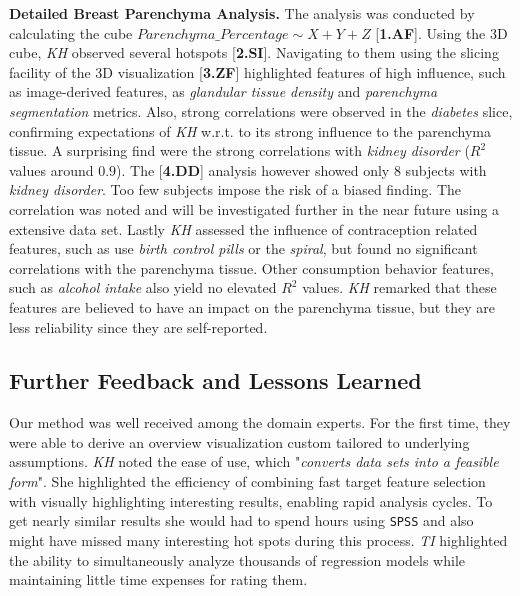\documentclass[journal]{style/vgtc} 			          %
\begin{document}
\textbf{Detailed Breast Parenchyma Analysis.}
The analysis was conducted by calculating the cube $Parenchyma\_Percentage \sim X + Y + Z$ [\textbf{1.AF}].
Using the 3D cube, \emph{KH} observed several hotspots [\textbf{2.SI}].
Navigating to them using the slicing facility of the 3D visualization [\textbf{3.ZF}] highlighted features of high influence, such as image-derived features, as \emph{glandular tissue density} and \emph{parenchyma segmentation} metrics.
Also, strong correlations were observed in the \emph{diabetes} slice, confirming expectations of \emph{KH} w.r.t. to its strong influence to the parenchyma tissue.
A surprising find were the strong correlations with \emph{kidney disorder} ($R^2$ values around $0.9$).
The [\textbf{4.DD}] analysis however showed only 8 subjects with \emph{kidney disorder}.
Too few subjects impose the risk of a biased finding.
The correlation was noted and will be investigated further in the near future using a extensive data set.
Lastly \emph{KH} assessed the influence of contraception related features, such as use \emph{birth control pills} or the \emph{spiral}, but found no significant correlations with the parenchyma tissue.
Other consumption behavior features, such as \emph{alcohol intake} also yield no elevated $R^2$ values.
\emph{KH} remarked that these features are believed to have an impact on the parenchyma tissue, but they are less reliability since they are self-reported.
\subsection{Further Feedback and Lessons Learned} \label{Lessons Learned}
Our method was well received among the domain experts.
For the first time, they were able to derive an overview visualization custom tailored to underlying assumptions.
\emph{KH} noted the ease of use, which "\emph{converts data sets into a feasible form}".
She highlighted the efficiency of combining fast target feature selection with visually highlighting interesting results, enabling rapid analysis cycles.
To get nearly similar results she would had to spend hours using \texttt{SPSS} and also might have missed many interesting hot spots during this process.
\emph{TI} highlighted the ability to simultaneously analyze thousands of regression models while maintaining little time expenses for rating them.
\end{document}
